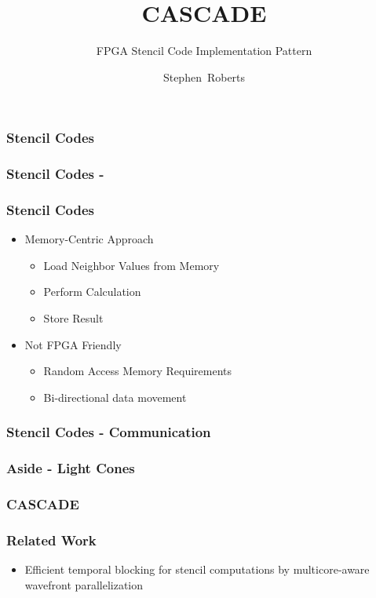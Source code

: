 \documentclass[draft]{beamer}
\title{CASCADE}
\subtitle{FPGA Stencil Code Implementation Pattern}
\author{Stephen~Roberts}
\institute{The University Of Warwick}
\begin{document}
  \frame{\titlepage}
  \begin{frame}
    \frametitle{Stencil Codes}
    \begin{figure}
      \centering
      
    \end{figure}
  \end{frame}

  \begin{frame}
    \frametitle{Stencil Codes - }
    \begin{figure}
      \centering
      
    \end{figure}
  \end{frame}

  \begin{frame}
    \frametitle{Stencil Codes}
    \begin{itemize}
      \item<1->{Memory-Centric Approach}
        \begin{itemize}
          \item{Load Neighbor Values from Memory}
          \item{Perform Calculation}
          \item{Store Result}
        \end{itemize}
      \item<2->{Not FPGA Friendly}
        \begin{itemize}
          \item{Random Access Memory Requirements}
          \item{Bi-directional data movement}
        \end{itemize}
    \end{itemize}
  \end{frame}

  \begin{frame}
    \frametitle{Stencil Codes - Communication}
    \begin{figure}
      \centering
      
    \end{figure}
  \end{frame}

  \begin{frame}
    \frametitle{Aside - Light Cones}
    \centering
    
  \end{frame}

  \begin{frame}
    \frametitle{CASCADE}
  \end{frame}

  \begin{frame}
    \frametitle{Related Work}
    \begin{itemize}
      \item{Efficient temporal blocking for stencil computations by multicore-aware wavefront
      parallelization}
    \end{itemize}
  \end{frame}
\end{document}
